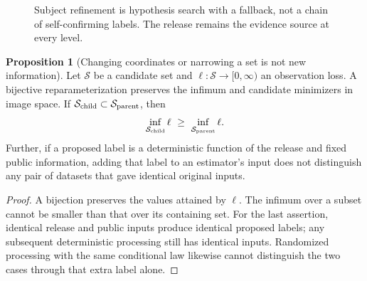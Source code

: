 \documentclass[11pt,a4paper]{article}
\theoremstyle{definition}
\newtheorem{proposition}[theorem]{Proposition}
\theoremstyle{definition}
\theoremstyle{remark}\newtheorem{remark}[theorem]{Remark}
\begin{document}
\begin{figure}[htbp]
\centering
{}
\caption{Subject refinement is hypothesis search with a fallback, not a chain of self-confirming labels. The release remains the evidence source at every level.}
\label{fig:hierarchy}
\end{figure}

\begin{proposition}[Changing coordinates or narrowing a set is not new information]\label{prop:refinement}
Let $\mathcal S$ be a candidate set and $\ell:\mathcal S\to[0,\infty)$ an observation loss. A bijective reparameterization preserves the infimum and candidate minimizers in image space. If $\mathcal S_{\rm child}\subset\mathcal S_{\rm parent}$, then
\[
\inf_{\mathcal S_{\rm child}}\ell\ \ge\ \inf_{\mathcal S_{\rm parent}}\ell.
\]
Further, if a proposed label is a deterministic function of the release and fixed public information, adding that label to an estimator's input does not distinguish any pair of datasets that gave identical original inputs.
\end{proposition}
\begin{proof}
A bijection preserves the values attained by $\ell$. The infimum over a subset cannot be smaller than that over its containing set. For the last assertion, identical release and public inputs produce identical proposed labels; any subsequent deterministic processing still has identical inputs. Randomized processing with the same conditional law likewise cannot distinguish the two cases through that extra label alone.
\end{proof}
\end{document}
